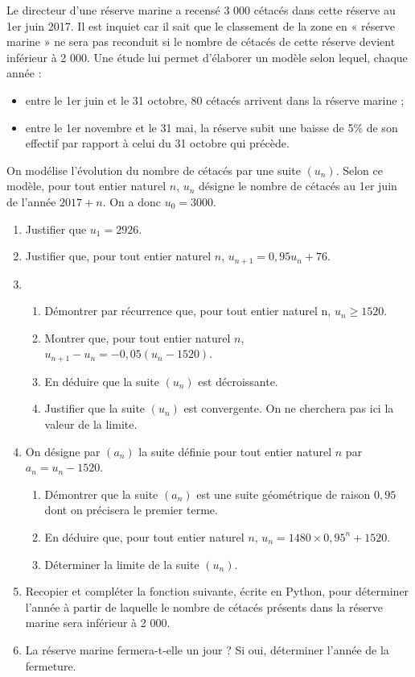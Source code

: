 \documentclass[11pt,fleqn, openany]{book} %
\begin{document}
\begin{exercise}[topic=lim14, subtitle={(Antilles-Guyane 2018)}]

Le directeur d'une réserve marine a recensé 3 000 cétacés dans cette réserve au 1er juin 2017. Il est inquiet car il sait que le classement de la zone en « réserve marine » ne sera pas reconduit si le nombre de cétacés de cette réserve devient inférieur à 2 000.
Une étude lui permet d'élaborer un modèle selon lequel, chaque année :
\begin{itemize}
\item entre le 1er juin et le 31 octobre, 80 cétacés arrivent dans la réserve marine ;
\item entre le 1er novembre et le 31 mai, la réserve subit une baisse de 5\% de son effectif par
rapport à celui du 31 octobre qui précède.\end{itemize}
On modélise l'évolution du nombre de cétacés par une suite $(u_n)$. Selon ce modèle, pour tout
entier naturel $n$, $u_n$ désigne le nombre de cétacés au 1er juin de l’année $2017 + n$. On a donc
$u_0 = 3000$.
\begin{enumerate}
\item Justifier que $u_1 = 2926$.
\item Justifier que, pour tout entier naturel $n$, $u_{n+1} = 0,95u_n +76$.
\item \begin{enumerate}
\item Démontrer par récurrence que, pour tout entier naturel n, $u_n \geqslant 1520$.
\item Montrer que, pour tout entier naturel $n$, $u_{n+1}-u_n = -0,05(u_n -1520)$.
\item En déduire que la suite $(u_n)$ est décroissante.
\item Justifier que la suite $(u_n)$ est convergente. On ne cherchera pas ici la valeur de la limite.\end{enumerate}
\item On désigne par $(a_n)$ la suite définie pour tout entier naturel $n$ par $a_n = u_n -1520$.
\begin{enumerate}
\item Démontrer que la suite $(a_n)$ est une suite géométrique de raison $0,95$ dont on précisera le premier terme.
\item En déduire que, pour tout entier naturel $n$, $u_n = 1480 \times 0,95^n +1520$.
\item Déterminer la limite de la suite $(u_n)$.\end{enumerate}
\item Recopier et compléter la fonction suivante, écrite en Python, pour déterminer l'année à partir de laquelle le
nombre de cétacés présents dans la réserve marine sera inférieur à 2 000.



\item La réserve marine fermera-t-elle un jour ? Si oui, déterminer l'année de la fermeture.\end{enumerate}
\newpage
\end{exercise}
\end{document}

